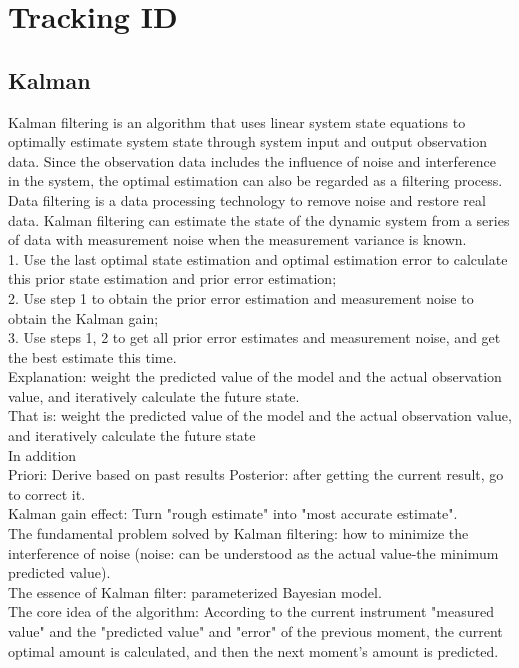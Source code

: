 \chapter{Tracking ID}
\section{Kalman}
Kalman filtering is an algorithm that uses linear system state equations to optimally estimate system state through system input and output observation data. Since the observation data includes the influence of noise and interference in the system, the optimal estimation can also be regarded as a filtering process.\\
Data filtering is a data processing technology to remove noise and restore real data. Kalman filtering can estimate the state of the dynamic system from a series of data with measurement noise when the measurement variance is known.\\


1. Use the last optimal state estimation and optimal estimation error to calculate this prior state estimation and prior error estimation;\\
2. Use step 1 to obtain the prior error estimation and measurement noise to obtain the Kalman gain;\\
3. Use steps 1, 2 to get all prior error estimates and measurement noise, and get the best estimate this time.\\
Explanation: weight the predicted value of the model and the actual observation value, and iteratively calculate the future state.\\
That is: weight the predicted value of the model and the actual observation value, and iteratively calculate the future state\\


In addition\\
Priori: Derive based on past results
Posterior: after getting the current result, go to correct it.\\
Kalman gain effect: Turn "rough estimate" into "most accurate estimate".\\
The fundamental problem solved by Kalman filtering: how to minimize the interference of noise (noise: can be understood as the actual value-the minimum predicted value).\\The essence of Kalman filter: parameterized Bayesian model.\\
The core idea of the algorithm: According to the current instrument "measured value" and the "predicted value" and "error" of the previous moment, the current optimal amount is calculated, and then the next moment's amount is predicted.\\
